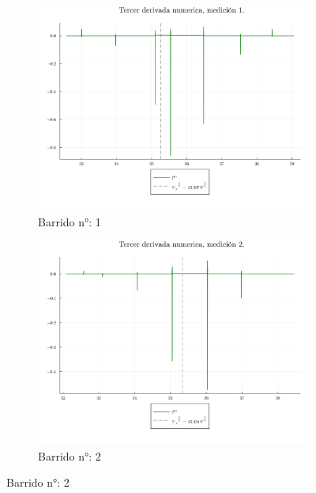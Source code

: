\begin{figure}[H]
	\centering
	\begin{subfigure}[b]{0.49\textwidth}
		\centering
		\includegraphics[width=\linewidth]{img/potderst1.png}
		\caption{Barrido n°: 1}
		\label{fig:potderst1}
	\end{subfigure}
	\hfill
	\begin{subfigure}[b]{0.49\textwidth}
		\centering
		\includegraphics[width=\linewidth]{img/potderst2.png}
		\caption{Barrido n°: 2}
		\label{fig:potderst2}
	\end{subfigure}
	
\end{figure}

